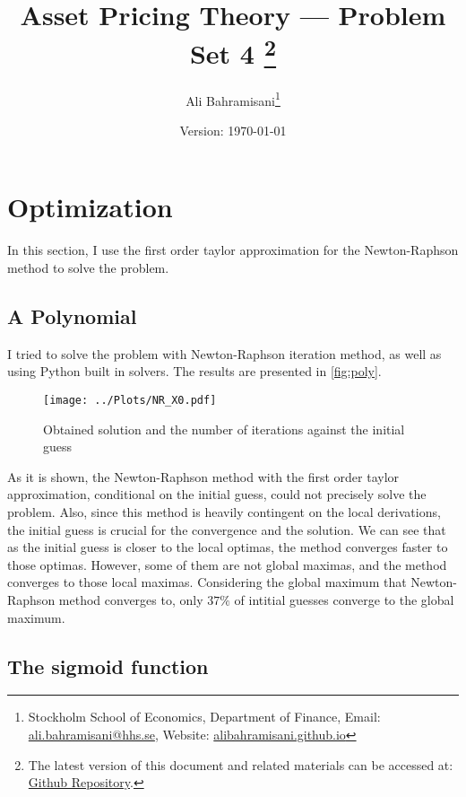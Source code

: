 \documentclass[a4paper,10pt,american]{article}
\title{Asset Pricing Theory --- Problem Set 4
\thanks{
    The latest version of this document and related 
    materials can be accessed at: 
    \href{https://github.com/AliBahramiSani/TAP_Opt_VaR}{Github Repository}.
}}
\author{Ali Bahramisani\thanks{Stockholm School
of Economics, Department of Finance, Email: 
\href{mailto:ali.bahramisani@hhs.se}{ali.bahramisani@hhs.se}, Website: \href{https://alibahramisani.github.io}{alibahramisani.github.io}}}
\date{Version: \today} %
\begin{document}
\maketitle
\thispagestyle{empty}



\newpage
{}

\section{Optimization}
In this section, I use the first order taylor approximation for the Newton-Raphson method to solve the problem.

\subsection{A Polynomial}
I tried to solve the problem with Newton-Raphson iteration method, as well as using Python built in solvers. The results are presented in \autoref{fig:poly}.

\begin{figure}[H]
\centering
\texttt{[image: ../Plots/NR\_X0.pdf]}
\caption{Obtained solution and the number of iterations against the initial guess}
\label{fig:poly}
\end{figure}

As it is shown, the Newton-Raphson method with the first order taylor approximation, conditional on the initial guess, could not precisely solve the problem. Also, since this method is heavily contingent on the local derivations, the initial guess is crucial for the convergence and the solution. We can see that as the initial guess is closer to the local optimas, the method converges faster to those optimas. However, some of them are not global maximas, and the method converges to those local maximas. Considering the global maximum that Newton-Raphson method converges to, only $37\%$ of intitial guesses converge to the global maximum. 

\subsection{The sigmoid function}
\end{document}
